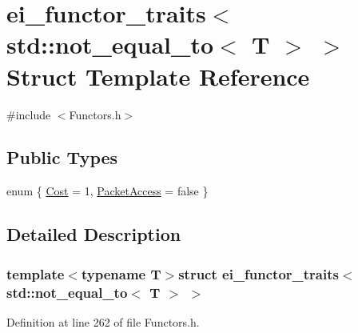 \hypertarget{structei__functor__traits_3_01std_1_1not__equal__to_3_01_t_01_4_01_4}{\section{ei\-\_\-functor\-\_\-traits$<$ std\-:\-:not\-\_\-equal\-\_\-to$<$ T $>$ $>$ Struct Template Reference}
\label{structei__functor__traits_3_01std_1_1not__equal__to_3_01_t_01_4_01_4}
}


{\ttfamily \#include $<$Functors.\-h$>$}

\subsection*{Public Types}
\begin{DoxyCompactItemize}
\item 
enum \{ \hyperlink{structei__functor__traits_3_01std_1_1not__equal__to_3_01_t_01_4_01_4_a96f62471928fab14381422f7d2290e34aa4fd9820697cb1eacb9d74e9c29e6ba4}{Cost} = 1, 
\hyperlink{structei__functor__traits_3_01std_1_1not__equal__to_3_01_t_01_4_01_4_a96f62471928fab14381422f7d2290e34a4d23230187b0f37f718e6eda5e89c70a}{Packet\-Access} = false
 \}
\end{DoxyCompactItemize}


\subsection{Detailed Description}
\subsubsection*{template$<$typename T$>$struct ei\-\_\-functor\-\_\-traits$<$ std\-::not\-\_\-equal\-\_\-to$<$ T $>$ $>$}



Definition at line 262 of file Functors.\-h.



